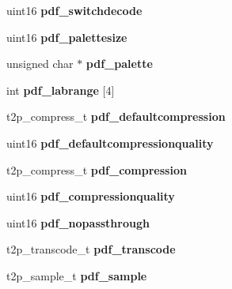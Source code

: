 \begin{DoxyCompactItemize}
\item 
\hypertarget{struct_t2_p_ade38278f61c6c6b01741df3252bf4452}{}uint16 {\bfseries pdf\+\_\+switchdecode}\label{struct_t2_p_ade38278f61c6c6b01741df3252bf4452}

\item 
\hypertarget{struct_t2_p_ac153ce3b03d0066fb5a468003e0fcc5e}{}uint16 {\bfseries pdf\+\_\+palettesize}\label{struct_t2_p_ac153ce3b03d0066fb5a468003e0fcc5e}

\item 
\hypertarget{struct_t2_p_ac9a16584456eac34936e081eed91f3bd}{}unsigned char $\ast$ {\bfseries pdf\+\_\+palette}\label{struct_t2_p_ac9a16584456eac34936e081eed91f3bd}

\item 
\hypertarget{struct_t2_p_abab0090fbb24e475f4276b65abd20d05}{}int {\bfseries pdf\+\_\+labrange} \mbox{[}4\mbox{]}\label{struct_t2_p_abab0090fbb24e475f4276b65abd20d05}

\item 
\hypertarget{struct_t2_p_a774fa866af99da3cedc43c0c282f5ce3}{}t2p\+\_\+compress\+\_\+t {\bfseries pdf\+\_\+defaultcompression}\label{struct_t2_p_a774fa866af99da3cedc43c0c282f5ce3}

\item 
\hypertarget{struct_t2_p_a7571b64c8c0ab5e5e2a8d63b97d68686}{}uint16 {\bfseries pdf\+\_\+defaultcompressionquality}\label{struct_t2_p_a7571b64c8c0ab5e5e2a8d63b97d68686}

\item 
\hypertarget{struct_t2_p_a1fd43eec4cb4c3803893c51e52b643a6}{}t2p\+\_\+compress\+\_\+t {\bfseries pdf\+\_\+compression}\label{struct_t2_p_a1fd43eec4cb4c3803893c51e52b643a6}

\item 
\hypertarget{struct_t2_p_ac2e105b5deee167c8b9c21238038959c}{}uint16 {\bfseries pdf\+\_\+compressionquality}\label{struct_t2_p_ac2e105b5deee167c8b9c21238038959c}

\item 
\hypertarget{struct_t2_p_a2304f1ccc5c4782e831eea93dc5ac2ae}{}uint16 {\bfseries pdf\+\_\+nopassthrough}\label{struct_t2_p_a2304f1ccc5c4782e831eea93dc5ac2ae}

\item 
\hypertarget{struct_t2_p_a6eae490e74de2993e02f134c4f6da9c9}{}t2p\+\_\+transcode\+\_\+t {\bfseries pdf\+\_\+transcode}\label{struct_t2_p_a6eae490e74de2993e02f134c4f6da9c9}

\item 
\hypertarget{struct_t2_p_a422263361df968b27616d208b07be8a7}{}t2p\+\_\+sample\+\_\+t {\bfseries pdf\+\_\+sample}\label{struct_t2_p_a422263361df968b27616d208b07be8a7}


\end{DoxyCompactItemize}
